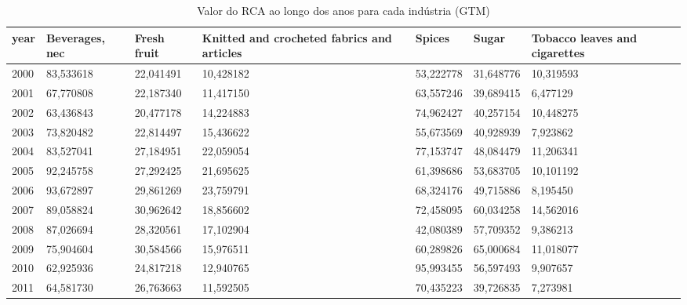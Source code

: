 \begin{table}
\centering
\caption{Valor do RCA ao longo dos anos para cada indústria (GTM)}
\begin{tabular}{p{1cm}p{2cm}p{2cm}p{2cm}p{2cm}p{2cm}p{2cm}}
\toprule
 year &  Beverages, nec &  Fresh fruit &  Knitted and crocheted fabrics and articles &    Spices &     Sugar &  Tobacco leaves and cigarettes \\
\midrule
 2000 &       83,533618 &    22,041491 &                                   10,428182 & 53,222778 & 31,648776 &                      10,319593 \\
 2001 &       67,770808 &    22,187340 &                                   11,417150 & 63,557246 & 39,689415 &                       6,477129 \\
 2002 &       63,436843 &    20,477178 &                                   14,224883 & 74,962427 & 40,257154 &                      10,448275 \\
 2003 &       73,820482 &    22,814497 &                                   15,436622 & 55,673569 & 40,928939 &                       7,923862 \\
 2004 &       83,527041 &    27,184951 &                                   22,059054 & 77,153747 & 48,084479 &                      11,206341 \\
 2005 &       92,245758 &    27,292425 &                                   21,695625 & 61,398686 & 53,683705 &                      10,101192 \\
 2006 &       93,672897 &    29,861269 &                                   23,759791 & 68,324176 & 49,715886 &                       8,195450 \\
 2007 &       89,058824 &    30,962642 &                                   18,856602 & 72,458095 & 60,034258 &                      14,562016 \\
 2008 &       87,026694 &    28,320561 &                                   17,102904 & 42,080389 & 57,709352 &                       9,386213 \\
 2009 &       75,904604 &    30,584566 &                                   15,976511 & 60,289826 & 65,000684 &                      11,018077 \\
 2010 &       62,925936 &    24,817218 &                                   12,940765 & 95,993455 & 56,597493 &                       9,907657 \\
 2011 &       64,581730 &    26,763663 &                                   11,592505 & 70,435223 & 39,726835 &                       7,273981 \\

\end{tabular}
\end{table}
